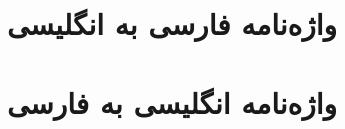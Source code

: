 \documentclass[12pt]{report}
\begin{document}


\newpage
\pagestyle{plain}
\setcounter{page}{1}


\tableofcontents

\newpage
\pagestyle{plain}
\setcounter{page}{1}


\chapter*{واژه‌نامه فارسی به انگلیسی}
\chapter*{ واژه‌نامه انگلیسی به فارسی}




\newpage

\end{document}
